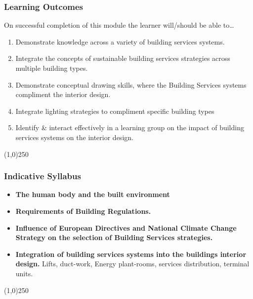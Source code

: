  
 \begin{frame}
\frametitle{Learning Outcomes}
On successful completion of this module the learner will/should be able to\ldots
\begin{enumerate}
	\item Demonstrate knowledge across a variety of building services systems.
	\item Integrate the concepts of sustainable building services strategies across multiple building types.
	\item Demonstrate conceptual drawing skills, where the Building Services systems compliment the interior design.
	\item Integrate lighting strategies to compliment specific building types
	\item Identify \& interact effectively in a learning group on the impact of building services systems on the interior design.
\end{enumerate}
\end{frame}
\begin{center}\line(1,0){250}\end{center}



\begin{frame}
\frametitle{Indicative Syllabus}

\begin{itemize}
	\item \textbf{The human body and the built environment}
	\item\textbf{Requirements of Building Regulations.}
	\item\textbf{Influence of European Directives and National Climate Change Strategy on the selection of
Building Services strategies.}
	\item\textbf{Integration of building services systems into the buildings interior design.} Lifts, duct-work, Energy plant-rooms, services distribution, terminal units. 
\end{itemize}
\end{frame}
\begin{center}\line(1,0){250}\end{center}





